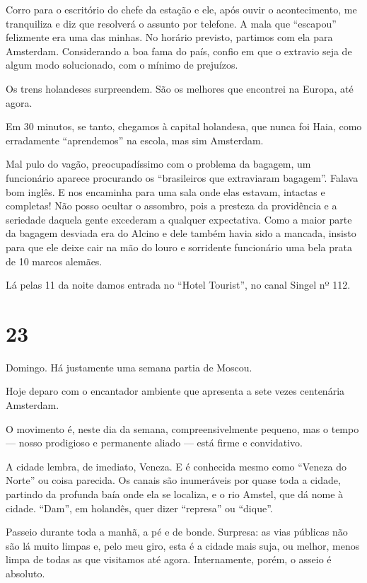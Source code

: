 Corro para o escritório do chefe da estação e ele, após ouvir o acontecimento, me tranquiliza e diz que resolverá o assunto por telefone. A mala que ``escapou'' felizmente era uma das minhas. No horário previsto, partimos com ela para Amsterdam. Considerando a boa fama do país, confio em que o extravio seja de algum modo solucionado, com o mínimo de prejuízos.

Os trens holandeses surpreendem. São os melhores que encontrei na Europa, até agora.

Em 30 minutos, se tanto, chegamos à capital holandesa, que nunca foi Haia, como erradamente ``aprendemos'' na escola, mas sim Amsterdam.

Mal pulo do vagão, preocupadíssimo com o problema da bagagem, um funcionário aparece procurando os ``brasileiros que extraviaram bagagem''. Falava bom inglês. E nos encaminha para uma sala onde elas estavam, intactas e completas! Não posso ocultar o assombro, pois a presteza da providência e a seriedade daquela gente excederam a qualquer expectativa. Como a maior parte da bagagem desviada era do Alcino e dele também havia sido a mancada, insisto para que ele deixe cair na mão do louro e sorridente funcionário uma bela prata de 10 marcos alemães.

Lá pelas 11 da noite damos entrada no ``Hotel Tourist'', no canal Singel nº 112.

\section*{23 \adfflatleafright {}}
Domingo. Há justamente uma semana partia de Moscou.

Hoje deparo com o encantador ambiente que apresenta a sete vezes centenária Amsterdam.

O movimento é, neste dia da semana, compreensivelmente pequeno, mas o tempo --- nosso prodigioso e permanente aliado --- está firme e convidativo.

A cidade lembra, de imediato, Veneza. E é conhecida mesmo como ``Veneza do Norte'' ou coisa parecida. Os canais são inumeráveis por quase toda a cidade, partindo da profunda baía onde ela se localiza, e o rio Amstel, que dá nome à cidade. ``Dam'', em holandês, quer dizer ``represa'' ou ``dique''.

Passeio durante toda a manhã, a pé e de bonde. Surpresa: as vias públicas não são lá muito limpas e, pelo meu giro, esta é a cidade mais suja, ou melhor, menos limpa de todas as que visitamos até agora. Internamente, porém, o asseio é absoluto.


